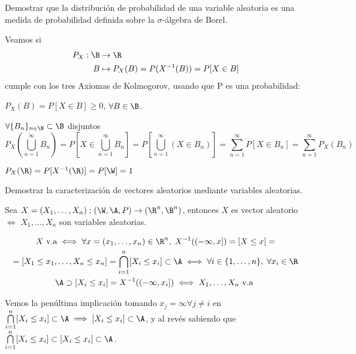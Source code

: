 \begin{ejer}\label{ej:distributionproof}
  Demostrar que la distribución de probabilidad de una variable aleatoria es una medida de probabilidad definida sobre la $\sigma$-álgebra de Borel.
\end{ejer}

\begin{sol}
  Veamos si
  \begin{align*}
    P_X : \B & \to \R \\
    B & \mapsto P_X(B) = P(X^{-1}(B)) = P[X \in B]
  \end{align*}
  cumple con los tres Axiomas de Kolmogorov, usando que P es una probabilidad:

  \begin{nlist}
    \item $P_X(B) = P[X \in B] \geq 0$, $\forall B \in \B$.
    \item $\forall \{B_n\}_{n \in \N} \subset \B$ disjuntos $$ P_X(\bigcup \limits^\infty_{n = 1} B_n) = P[X \in \bigcup \limits^\infty_{n = 1} B_n] = P[\bigcup \limits^\infty_{n = 1} (X \in B_n)] = \sum \limits^\infty_{n = 1} P[X \in B_n] = \sum \limits^\infty_{n = 1} P_X(B_n)$$
    \item $P_X(\R) = P[X^{-1}(\R)] = P[\W] = 1$
  \end{nlist}
\end{sol}

\begin{ejer}
  Demostrar la caracterización de vectores aleatorios mediante variables aleatorias.
\end{ejer}

\begin{sol}
  Sea $X = (X_1, \ldots, X_n) : (\W, \A, P) \to (\R^n, \B^n)$, entonces $X$ es vector aleatorio $\iff$ $X_1, \ldots, X_n$ son variables aleatorias.

  \begin{multline*}
    X \text{ v.a} \iff \forall x = (x_1, \ldots, x_n) \in \R^n, \; X^{-1}((-\infty, x]) = [X \leq x] = \\ =  [X_1 \leq x_1, \ldots, X_n \leq x_n] = \bigcap \limits^n_{i = 1} [X_i \leq x_i] \subset \A \iff \forall i \in \{1, \ldots, n\}, \; \forall x_i \in \R \\ \A \supset [X_i \leq x_i] = X^{-1}((-\infty, x_i]) \iff X_1, \ldots, X_n \text{ v.a }
  \end{multline*}

  Vemos la penúltima implicación tomando $x_j = \infty \forall j \neq i$ en $\bigcap \limits^n_{i = 1} [X_i \leq x_i] \subset \A \implies [X_i \leq x_i] \subset \A$, y al revés sabiendo que $\bigcap \limits^n_{i = 1} [X_i \leq x_i] \subset [X_i \leq x_i] \subset \A$.
\end{sol}

